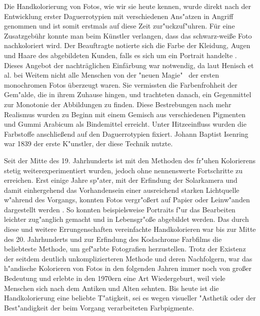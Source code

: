 \documentclass[12pt,titlepage]{article}
\begin{document}
Die Handkolorierung von Fotos, wie wir sie heute kennen, wurde direkt nach der Entwicklung erster Daguerrotypien mit verschiedenen Ans"atzen in Angriff genommen und ist somit erstmals auf diese Zeit zur"uckzuf"uhren. Für eine Zusatzgebühr konnte man beim Künstler verlangen, dass das schwarz-weiße Foto nachkoloriert wird. Der Beauftragte notierte sich die Farbe der Kleidung, Augen und Haare des abgebildeten Kunden, falls es sich um ein Portrait handelte \textsc{\cite{hannavy2013encyclopedia}}. Dieses Angebot der nachträglichen Einfärbung war notwendig, da laut Henisch et al. \textsc{\cite{henisch1996painted}} bei Weitem nicht alle Menschen von der "neuen Magie" \ der ersten monochromen Fotos überzeugt waren. Sie vermissten die Farbenfrohheit der Gem"alde, die in ihrem Zuhause hingen, und trachteten danach, ein Gegenmittel zur Monotonie der Abbildungen zu finden. Diese Bestrebungen nach mehr Realismus wurden zu Beginn mit einem Gemisch aus verschiedenen Pigmenten und Gummi Arabicum als Bindemittel erreicht. Unter Hitzeeinfluss wurden die Farbstoffe anschlie\ss end auf den Daguerrotypien fixiert. Johann Baptist Isenring war 1839 der erste K"unstler, der diese Technik nutzte. \textsc{\cite{ferguson2008living, henisch1996painted}} 

Seit der Mitte des 19. Jahrhunderts ist mit den Methoden des fr"uhen Kolorierens stetig weiterexperimentiert wurden, jedoch ohne nennenswerte Fortschritte zu erreichen. Erst einige Jahre sp"ater, mit der Erfindung der Solarkamera und damit einhergehend das Vorhandensein einer ausreichend starken Lichtquelle w"ahrend des Vorgangs, konnten Fotos vergr"o\ss ert auf Papier oder Leinw"anden dargestellt werden \textsc{\cite{towler1873silver}}. So konnten beispielsweise Portraits f"ur das Bearbeiten leichter zug"anglich gemacht und in Lebensgr"o\ss e abgebildet werden. Das durch diese und weitere Errungenschaften vereinfachte Handkolorieren war bis zur Mitte des 20. Jahrhunderts und zur Erfindung des Kodachrome Farbfilms die beliebteste Methode, um gef"arbte Fotografien herzustellen. 
Trotz der Existenz der seitdem deutlich unkomplizierteren Methode und deren Nachfolgern, war das h"andische Kolorieren von Fotos in den folgenden Jahren immer noch von gro\ss er Bedeutung und erlebte in den 1970ern eine Art Wiedergeburt, weil viele Menschen sich nach dem Antiken und Alten sehnten. Bis heute ist die Handkolorierung eine beliebte T"atigkeit, sei es wegen visueller "Asthetik oder der Best"andigkeit der beim Vorgang verarbeiteten Farbpigmente. \textsc{\cite{ivankovich2005early}}
\end{document}
